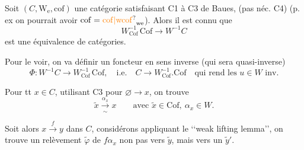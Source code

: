 
Soit $(C,\mathrm{W}_{\mathrm e},\mathrm{cof})$ une catégorie satisfaisant C1 à C3 de Baues, (pas néc. C4) (p. ex on pourrait avoir $\mathrm{cof}=\unsure{\mathrm{cof}|\mathrm{wcof}}_{\mathrm{we}}$).  Alors il est connu que
\[
 W_{\mathrm{Cof}}^{-1}\,\mathrm{Cof}\longrightarrow W^{-1}C
\]
est une équivalence de catégories.

Pour le voir, on va définir un foncteur en sens inverse (qui sera quasi-inverse)
\[
 \Phi\colon W^{-1}C\longrightarrow W_{\mathrm{Cof}}^{-1}\,\mathrm{Cof},\quad
 \text{i.e.}\quad C\longrightarrow W_{\mathrm{Cof}}^{-1}.\mathrm{Cof}
 \quad\text{qui rend les }u\in W\text{ inv.}
\]

Pour tt $x\in C$, utilisant C3 pour $\varnothing\longrightarrow x$, on trouve
\[
 \widetilde x\xrightarrow[\sim]{\alpha_x}x
 \qquad\text{avec }\widetilde x\in\mathrm{Cof},\ \alpha_x\in W .
\]

Soit alors $x\xrightarrow{f}y$ dans $C$,
considérons
appliquant le \lq\lq weak lifting lemma\rq\rq, on trouve
un relèvement $\widetilde\varphi$  de $f\alpha_x$ non pas  vers $\widetilde y$, mais vers un $\widetilde y'$.


